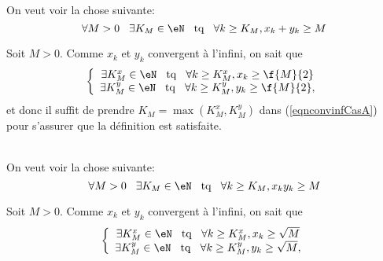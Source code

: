 \noindent On veut voir  la chose suivante:
\begin{equation}\label{eqnconvinfCasA}
   \forall M > 0 \hspace{0.3cm} \exists K_M \in \eN \hspace{0.3cm} {\rm tq} \hspace{0.3cm} \forall k \geq K_M, x_k + y_k \geq M 
  \end{equation}

\noindent Soit $M> 0$. Comme $x_k$ et $y_k$ convergent à l'infini, on sait que 
\[\left\{\begin{array}{c}   
         \exists K^x_M \in \eN \hspace{0.3cm} {\rm tq} \hspace{0.3cm} \forall k \geq K^x_M, x_k \geq \f{M}{2}\\																		 
        \exists K^y_M \in \eN \hspace{0.3cm} {\rm tq} \hspace{0.3cm} \forall k \geq K^y_M, y_k \geq \f{M}{2},																		
\end{array}\right.\]
et donc il suffit de prendre $K_M = \max(K_M^x, K_M^y)$ dans (\ref{eqnconvinfCasA}) pour s'assurer que la définition est satisfaite.


\vspace{0.5cm}
\\

\noindent On veut voir la chose suivante:
\begin{equation}
 \label{eqnconvinfprod}  \forall M > 0 \hspace{0.3cm} \exists K_M \in \eN \hspace{0.3cm} {\rm tq} \hspace{0.3cm} \forall k \geq K_M, x_k  y_k \geq M \end{equation}

\noindent Soit $M> 0$. Comme $x_k$ et $y_k$ convergent à l'infini, on sait que 
\[\left\{\begin{array}{c}   
         \exists K^x_M \in \eN \hspace{0.3cm} {\rm tq} \hspace{0.3cm} \forall k \geq K^x_M, x_k \geq \sqrt M\\																		 
        \exists K^y_M \in \eN \hspace{0.3cm} {\rm tq} \hspace{0.3cm} \forall k \geq K^y_M, y_k \geq \sqrt M,																		
\end{array}\right.\]

